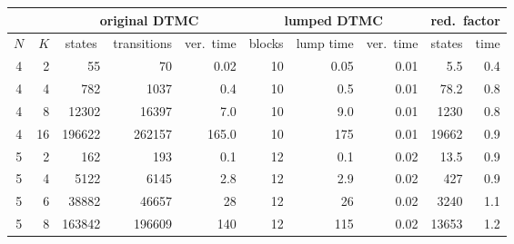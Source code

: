 \documentclass{llncs}
\begin{document}
{\scriptsize
\begin{center}
\begin{tabular}{|c|r|r|r|r|r|r|r|r|r|}
\hline 
\multicolumn{2}{|c}{} & \multicolumn{3}{c|}{original DTMC} & \multicolumn{3}{c|}{lumped DTMC} 
  & \multicolumn{2}{c|}{red.\ factor} \\[1ex] \hline 
$N$&$K$& \multicolumn{1}{c|}{states}&transitions& ver.\ time   &blocks& lump time   &ver.\ time& \multicolumn{1}{c|}{states} &time \\ \hline
4 &  2 &     55 &     70 &   0.02          & 10 &   0.05          & 0.01 &     5.5          & 0.4 \\
4 &  4 &    782 &   1037 &   0.4\phantom{0}& 10 &   0.5\phantom{0}& 0.01 &    78.2          & 0.8 \\
4 &  8 &  12302 &  16397 &   7.0\phantom{0}& 10 &   9.0\phantom{0}& 0.01 &  1230\phantom{.0}& 0.8 \\
4 & 16 & 196622 & 262157 & 165.0\phantom{0}& 10 & 175\phantom{.00}& 0.01 & 19662\phantom{.0}& 0.9 \\ \hline 
5 &  2 &    162 &    193 &   0.1\phantom{0}& 12 &   0.1\phantom{0}& 0.02 &    13.5          & 0.9 \\
5 &  4 &   5122 &   6145 &   2.8\phantom{0}& 12 &   2.9\phantom{0}& 0.02 &   427\phantom{.0}& 0.9 \\
5 &  6 &  38882 &  46657 &  28\phantom{.00}& 12 &  26\phantom{.00}& 0.02 &  3240\phantom{.0}& 1.1 \\
5 &  8 & 163842 & 196609 & 140\phantom{.00}& 12 & 115\phantom{.00}& 0.02 & 13653\phantom{.0}& 1.2 \\ \hline 
\end{tabular}
\end{center}
}
\end{document}
